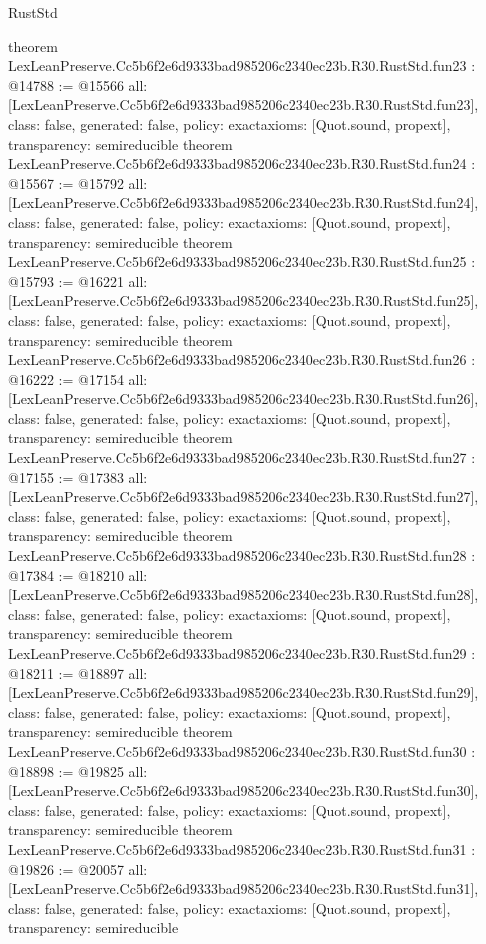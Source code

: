 \begin{lexlean}{RustStd}
\begin{coremodule}
{}
theorem LexLeanPreserve.Cc5b6f2e6d9333bad985206c2340ec23b.R30.RustStd.fun23 : @14788 := @15566 {
  all: [LexLeanPreserve.Cc5b6f2e6d9333bad985206c2340ec23b.R30.RustStd.fun23],
  class: false,
  generated: false,
  policy: exact{axioms: [Quot.sound, propext]},
  transparency: semireducible
}
theorem LexLeanPreserve.Cc5b6f2e6d9333bad985206c2340ec23b.R30.RustStd.fun24 : @15567 := @15792 {
  all: [LexLeanPreserve.Cc5b6f2e6d9333bad985206c2340ec23b.R30.RustStd.fun24],
  class: false,
  generated: false,
  policy: exact{axioms: [Quot.sound, propext]},
  transparency: semireducible
}
theorem LexLeanPreserve.Cc5b6f2e6d9333bad985206c2340ec23b.R30.RustStd.fun25 : @15793 := @16221 {
  all: [LexLeanPreserve.Cc5b6f2e6d9333bad985206c2340ec23b.R30.RustStd.fun25],
  class: false,
  generated: false,
  policy: exact{axioms: [Quot.sound, propext]},
  transparency: semireducible
}
theorem LexLeanPreserve.Cc5b6f2e6d9333bad985206c2340ec23b.R30.RustStd.fun26 : @16222 := @17154 {
  all: [LexLeanPreserve.Cc5b6f2e6d9333bad985206c2340ec23b.R30.RustStd.fun26],
  class: false,
  generated: false,
  policy: exact{axioms: [Quot.sound, propext]},
  transparency: semireducible
}
theorem LexLeanPreserve.Cc5b6f2e6d9333bad985206c2340ec23b.R30.RustStd.fun27 : @17155 := @17383 {
  all: [LexLeanPreserve.Cc5b6f2e6d9333bad985206c2340ec23b.R30.RustStd.fun27],
  class: false,
  generated: false,
  policy: exact{axioms: [Quot.sound, propext]},
  transparency: semireducible
}
theorem LexLeanPreserve.Cc5b6f2e6d9333bad985206c2340ec23b.R30.RustStd.fun28 : @17384 := @18210 {
  all: [LexLeanPreserve.Cc5b6f2e6d9333bad985206c2340ec23b.R30.RustStd.fun28],
  class: false,
  generated: false,
  policy: exact{axioms: [Quot.sound, propext]},
  transparency: semireducible
}
theorem LexLeanPreserve.Cc5b6f2e6d9333bad985206c2340ec23b.R30.RustStd.fun29 : @18211 := @18897 {
  all: [LexLeanPreserve.Cc5b6f2e6d9333bad985206c2340ec23b.R30.RustStd.fun29],
  class: false,
  generated: false,
  policy: exact{axioms: [Quot.sound, propext]},
  transparency: semireducible
}
theorem LexLeanPreserve.Cc5b6f2e6d9333bad985206c2340ec23b.R30.RustStd.fun30 : @18898 := @19825 {
  all: [LexLeanPreserve.Cc5b6f2e6d9333bad985206c2340ec23b.R30.RustStd.fun30],
  class: false,
  generated: false,
  policy: exact{axioms: [Quot.sound, propext]},
  transparency: semireducible
}
theorem LexLeanPreserve.Cc5b6f2e6d9333bad985206c2340ec23b.R30.RustStd.fun31 : @19826 := @20057 {
  all: [LexLeanPreserve.Cc5b6f2e6d9333bad985206c2340ec23b.R30.RustStd.fun31],
  class: false,
  generated: false,
  policy: exact{axioms: [Quot.sound, propext]},
  transparency: semireducible
}
\end{coremodule}
\end{lexlean}
